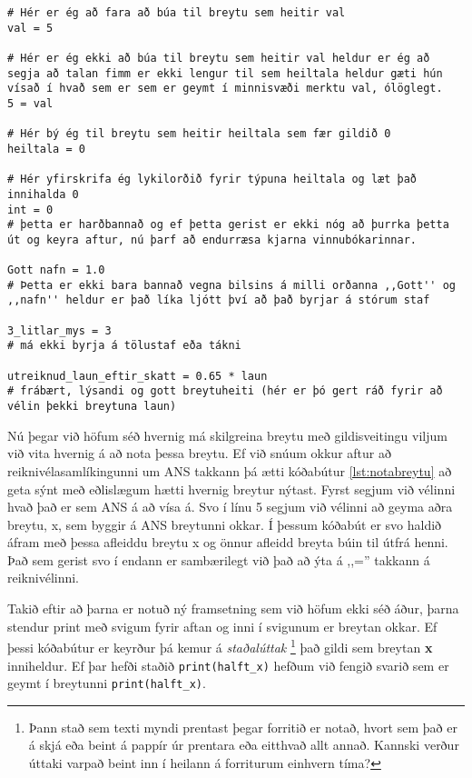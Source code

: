\begin{lstlisting}[caption=Dæmi um gildisvetingar\, réttar og rangar]
# Hér er ég að fara að búa til breytu sem heitir val
val = 5

# Hér er ég ekki að búa til breytu sem heitir val heldur er ég að segja að talan fimm er ekki lengur til sem heiltala heldur gæti hún vísað í hvað sem er sem er geymt í minnisvæði merktu val, ólöglegt.
5 = val

# Hér bý ég til breytu sem heitir heiltala sem fær gildið 0
heiltala = 0

# Hér yfirskrifa ég lykilorðið fyrir týpuna heiltala og læt það innihalda 0
int = 0
# þetta er harðbannað og ef þetta gerist er ekki nóg að þurrka þetta út og keyra aftur, nú þarf að endurræsa kjarna vinnubókarinnar.

Gott nafn = 1.0
# Þetta er ekki bara bannað vegna bilsins á milli orðanna ,,Gott'' og ,,nafn'' heldur er það líka ljótt því að það byrjar á stórum staf

3_litlar_mys = 3
# má ekki byrja á tölustaf eða tákni

utreiknud_laun_eftir_skatt = 0.65 * laun
# frábært, lýsandi og gott breytuheiti (hér er þó gert ráð fyrir að vélin þekki breytuna laun)
\end{lstlisting}

Nú þegar við höfum séð hvernig má skilgreina breytu með gildisveitingu viljum við vita hvernig á að nota þessa breytu.
Ef við snúum okkur aftur að reiknivélasamlíkingunni um ANS takkann þá ætti kóðabútur \ref{lst:notabreytu} að geta sýnt með eðlislægum hætti hvernig breytur nýtast.
Fyrst segjum við vélinni hvað það er sem ANS á að vísa á. Svo í línu 5 segjum við vélinni að geyma aðra breytu, x, sem byggir á ANS breytunni okkar.
Í þessum kóðabút er svo haldið áfram með þessa afleiddu breytu x og önnur afleidd breyta búin til útfrá henni.
Það sem gerist svo í endann er sambærilegt við það að ýta á ,,='' takkann á reiknivélinni.

Takið eftir að þarna er notuð ný framsetning sem við höfum ekki séð áður, þarna stendur print með svigum fyrir aftan og inni í svigunum er breytan okkar.
Ef þessi kóðabútur er keyrður þá kemur á \textit{staðalúttak} 
\footnote{Þann stað sem texti myndi prentast þegar forritið er notað, hvort sem það er á skjá eða beint á pappír úr prentara eða eitthvað allt annað. Kannski verður úttaki varpað beint inn í heilann á forriturum einhvern tíma?} 
það gildi sem breytan \textbf{x} inniheldur.
Ef þar hefði staðið \texttt{print(halft\_x)} hefðum við fengið svarið sem er geymt í breytunni \texttt{print(halft\_x)}.

